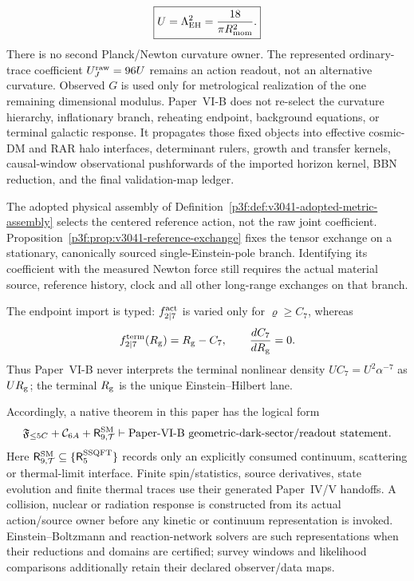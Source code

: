 \documentclass[12pt,a4paper]{article}
\newcommand{\Rssqft}{\mathsf R_5^{\rm SSQFT}}
\begin{document}
\[
 \boxed{U=\Lambda_{\rm EH}^2=\frac{18}{\pi R_{\mathrm{mom}}^2}.}
\]
There is no second Planck/Newton curvature owner.  The represented ordinary-trace coefficient \(U_J^{\rm raw}=96U\) remains an action readout, not an alternative curvature.  Observed \(G\) is used only for metrological realization of the one remaining dimensional modulus.  Paper~VI-B
does not re-select the curvature hierarchy,
inflationary branch, reheating endpoint, background equations, or terminal
galactic response.  It propagates those fixed objects into effective
cosmic-DM and RAR halo interfaces, determinant rulers, growth and
transfer kernels, causal-window observational pushforwards of the imported
horizon kernel, BBN reduction, and the final validation-map ledger.
\par\noindent
The adopted physical assembly of Definition~\ref{p3f:def:v3041-adopted-metric-assembly}
selects the centered reference action, not the raw joint coefficient.
Proposition~\ref{p3f:prop:v3041-reference-exchange} fixes the tensor
exchange on a stationary, canonically sourced single-Einstein-pole branch.
Identifying its coefficient with the measured Newton force still requires
the actual material source, reference history, clock and all other long-range
exchanges on that branch.\par


The endpoint import is typed: \(f_{2\mid7}^{\rm act}\) is varied only for
\(\varrho\ge C_7\), whereas
\[
 f_{2\mid7}^{\rm term}(R_{\rm g})=R_{\rm g}-C_7,\qquad
 \frac{dC_7}{dR_{\rm g}}=0.
\]
Thus Paper~VI-B never interprets the terminal nonlinear density
\(U C_7=U^2\alpha^{-7}\) as \(U R_{\rm g}\); the terminal
\(R_{\rm g}\) is the unique Einstein--Hilbert lane.

Accordingly, a native theorem in this paper has the logical form
\begin{equation}
\label{p9:eq:second-theorem-scope}
\mathfrak F_{\le5C}+\mathcal C_{6A}
+\mathsf R_{9,\mathcal T}^{\rm SM}
\vdash
\text{Paper-VI-B geometric-dark-sector/readout statement}.
\end{equation}
Here
\(\mathsf R_{9,\mathcal T}^{\rm SM}\subseteq\{\Rssqft\}\) records only an
explicitly consumed continuum, scattering or thermal-limit interface.
Finite spin/statistics, source derivatives, state evolution and finite thermal
traces use their generated Paper~IV/V handoffs.  A collision, nuclear or
radiation response is constructed from its actual action/source owner before
any kinetic or continuum representation is invoked.  Einstein--Boltzmann and
reaction-network solvers are such representations when their reductions and
domains are certified; survey windows and likelihood comparisons additionally
retain their declared observer/data maps.
\end{document}
